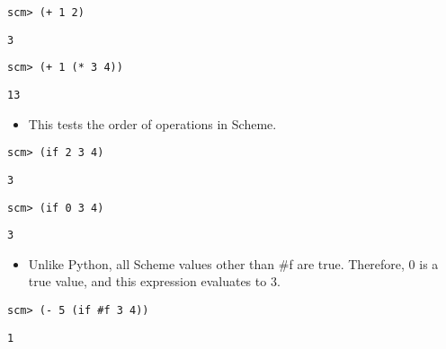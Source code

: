 \begin{lstlisting}
scm> (+ 1 2)
\end{lstlisting}
\begin{solution}[.25in]
\texttt{3}
\end{solution}

\begin{lstlisting}
scm> (+ 1 (* 3 4))
\end{lstlisting}
\begin{solution}[.25in]
\texttt{13}
\end{solution}
\begin{guide}
\begin{itemize}
\item This tests the order of operations in Scheme.
\end{itemize}
\end{guide}

\begin{lstlisting}
scm> (if 2 3 4)
\end{lstlisting}
\begin{solution}[.25in]
\texttt{3}
\end{solution}

\begin{lstlisting}
scm> (if 0 3 4)
\end{lstlisting}
\begin{solution}[.25in]
\texttt{3}
\end{solution}
\begin{guide}
\begin{itemize}
\item Unlike Python, all Scheme values other than \#f are true. Therefore, 0 is a true value, and this expression evaluates to 3.
\end{itemize}
\end{guide}

\begin{lstlisting}
scm> (- 5 (if #f 3 4))
\end{lstlisting}
\begin{solution}[.25in]
\texttt{1}
\end{solution}


\begin{comment}
\begin{lstlisting}
scm> (if nil 3 4)
\end{lstlisting}
\begin{solution}[.25in]
\texttt{3}
\end{solution}
\end{comment}

